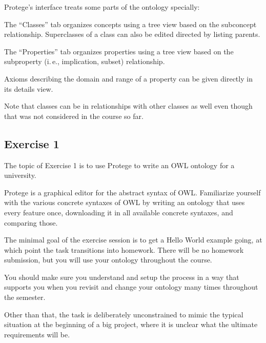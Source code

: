 Protege's interface treats some parts of the ontology specially:
\begin{compactitem}
\item The \enquote{Classes} tab organizes concepts using a tree view based on the subconcept relationship.
 Superclasses of a class can also be edited directed by listing parents.
 \item The \enquote{Properties} tab organizes properties using a tree view based on the subproperty (i.\,e., implication, subset) relationship.
 \item Axioms describing the domain and range of a property can be given directly in its details view.
\end{compactitem}

Note that classes can be in relationships with other classes as well even though that was not considered in the course so far.

\subsection{Exercise 1}

The topic of Exercise 1 is to use Protege to write an OWL ontology for a university.

Protege is a graphical editor for the abstract syntax of OWL.
Familiarize yourself with the various concrete syntaxes of OWL by writing an ontology that uses every feature once, downloading it in all available concrete syntaxes, and comparing those.

The minimal goal of the exercise session is to get a Hello World example going, at which point the task transitions into homework.
There will be no homework submission, but you will use your ontology throughout the course.

You should make sure you understand and setup the process in a way that supports you when you revisit and change your ontology many times throughout the semester.

Other than that, the task is deliberately unconstrained to mimic the typical situation at the beginning of a big project, where it is unclear what the ultimate requirements will be.
